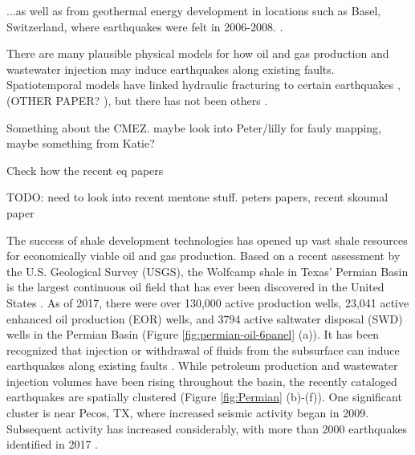 \documentclass{utexasthesis}
\begin{document}
...as well as from geothermal energy development in locations such as Basel, Switzerland, where earthquakes were felt in 2006-2008. \cite{Deichmann2009EarthquakesInducedStimulation}.


There are many plausible physical models for how oil and gas production and wastewater injection may induce earthquakes along existing faults.
Spatiotemporal models have linked hydraulic fracturing to certain earthquakes \citep{Savvaidis2020InducedSeismicityDelaware}, (OTHER PAPER? ), but there has not been others .


Something about the CMEZ. maybe look into Peter/lilly for fauly mapping, maybe something from Katie?

Check how the recent eq papers 

TODO: need to look into recent mentone stuff. peters papers, recent skoumal paper



The success of shale development technologies \citep{Waters2006use} has opened up vast shale resources for economically viable oil and gas production. Based on a recent assessment by the U.S. Geological Survey (USGS), the Wolfcamp shale in Texas' Permian Basin is the largest continuous oil field that has ever been discovered in the United States \citep{GaswirthAssessment2016}. As of 2017, there were over 130,000 active production wells, 23,041 active enhanced oil production (EOR) wells, and 3794 active saltwater disposal (SWD) wells in the Permian Basin (Figure \ref{fig:permian-oil-6panel} (a)). It has been recognized that injection or withdrawal of fluids from the subsurface can induce earthquakes along existing faults \citep{Ellsworth2013, simpson1988two}. While petroleum production and wastewater injection volumes have been rising throughout the basin, the recently cataloged earthquakes are spatially clustered (Figure \ref{fig:Permian} (b)-(f)). One significant cluster is near Pecos, TX, where increased seismic activity began in 2009. Subsequent activity has increased considerably, with more than 2000 earthquakes identified in 2017 \citep{Frohlich2019}.
\end{document}
